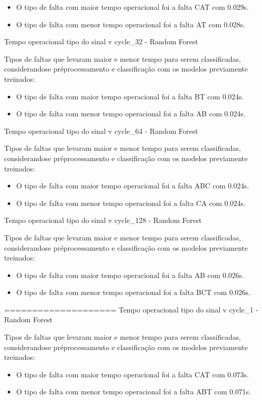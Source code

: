 \begin{itemize}
\item O tipo de falta com maior tempo operacional foi a falta CAT com 0.029s.
\item O tipo de falta com menor tempo operacional foi a falta AT com 0.028s.
\end{itemize}
Tempo operacional tipo do sinal v cycle_32 - Random Forest
\item Tipos de faltas que levaram maior e menor tempo para serem classificadas, considerando\hyph se pré\hyph processamento e classificação com os modelos previamente treinados:
\begin{itemize}
\item O tipo de falta com maior tempo operacional foi a falta BT com 0.024s.
\item O tipo de falta com menor tempo operacional foi a falta AB com 0.024s.
\end{itemize}
Tempo operacional tipo do sinal v cycle_64 - Random Forest
\item Tipos de faltas que levaram maior e menor tempo para serem classificadas, considerando\hyph se pré\hyph processamento e classificação com os modelos previamente treinados:
\begin{itemize}
\item O tipo de falta com maior tempo operacional foi a falta ABC com 0.024s.
\item O tipo de falta com menor tempo operacional foi a falta CA com 0.024s.
\end{itemize}
Tempo operacional tipo do sinal v cycle_128 - Random Forest
\item Tipos de faltas que levaram maior e menor tempo para serem classificadas, considerando\hyph se pré\hyph processamento e classificação com os modelos previamente treinados:
\begin{itemize}
\item O tipo de falta com maior tempo operacional foi a falta AB com 0.026s.
\item O tipo de falta com menor tempo operacional foi a falta BCT com 0.026s.
\end{itemize}
====================
Tempo operacional tipo do sinal v cycle_1 - Random Forest
\item Tipos de faltas que levaram maior e menor tempo para serem classificadas, considerando\hyph se pré\hyph processamento e classificação com os modelos previamente treinados:
\begin{itemize}
\item O tipo de falta com maior tempo operacional foi a falta CAT com 0.073s.
\item O tipo de falta com menor tempo operacional foi a falta ABT com 0.071s.
\end{itemize}
